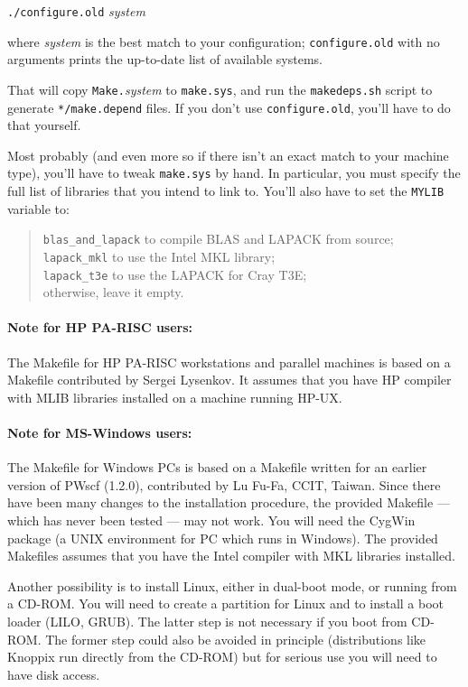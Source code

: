 \documentclass[12pt,a4paper]{article}
\begin{document}
\texttt{./configure.old} \emph{system}
\medskip

\noindent
where \emph{system} is the best match to your configuration;
\texttt{configure.old} with no arguments prints the up-to-date list of
available systems.

That will copy \texttt{Make.}\emph{system} to \texttt{make.sys}, and
run the \texttt{makedeps.sh} script to generate \texttt{*/make.depend}
files.  If you don't use \texttt{configure.old}, you'll have to do
that yourself.

Most probably (and even more so if there isn't an exact match to your
machine type), you'll have to tweak \texttt{make.sys} by hand.
In particular, you must specify the full list of libraries that
you intend to link to.
You'll also have to set the \texttt{MYLIB} variable to:
\begin{quote}
  \texttt{blas\_and\_lapack} to compile BLAS and LAPACK from source;\\
  \texttt{lapack\_mkl} to use the Intel MKL library;\\
  \texttt{lapack\_t3e} to use the LAPACK for Cray T3E;\\
  otherwise, leave it empty.
\end{quote}

\paragraph{Note for HP PA-RISC users:} 

The Makefile for HP PA-RISC workstations and parallel machines is
based on a Makefile contributed by Sergei Lysenkov.
It assumes that you have HP compiler with MLIB libraries installed on
a machine running HP-UX.

\paragraph{Note for MS-Windows users:} 

The Makefile for Windows PCs is based on a Makefile written for an
earlier version of PWscf (1.2.0), contributed by Lu Fu-Fa, CCIT,
Taiwan.
Since there have been many changes to the installation procedure, the
provided Makefile --- which has never been tested --- may not work.
You will need the CygWin package (a UNIX environment for PC which runs
in Windows).
The provided Makefiles assumes that you have the Intel compiler with
MKL libraries installed.

Another possibility is to install Linux, either in dual-boot mode, or
running from a CD-ROM.  You will need to create a partition for Linux
and to install a boot loader (LILO, GRUB).  The latter step is not
necessary if you boot from CD-ROM.  The former step could also be
avoided in principle (distributions like Knoppix run directly from the
CD-ROM) but for serious use you will need to have disk access.
\end{document}
